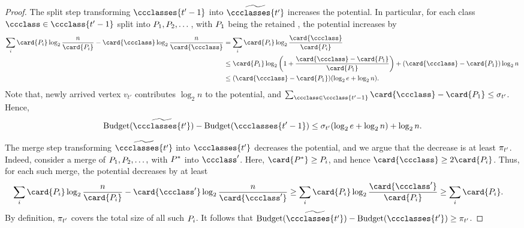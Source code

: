 \begin{proof}
    The split step transforming $ \ccclasses{t'-1} $ into $ \widetilde{\ccclasses{t'}} $ increases the potential. In particular, for each class $ \ccclass \in \ccclass{t'-1} $ split into $ P_{1}, P_{2}, \dots  $, with $ P_{1} $ being the retained \piece{}, the potential increases by
    \begin{align}
        \sum_{i} \card{\pieceToMerge_{i}}\log_{2} \frac{n}{\card{\pieceToMerge_{i}}} - \card{\ccclass}\log_{2} \frac{n}{\card{\ccclass}} &= \sum_{i}\card{\pieceToMerge_{i}} \log_{2}\dfrac{\card{\ccclass}}{\card{\pieceToMerge_{i}}} \nonumber \\
                                                                                                                                                 &\leq \card{\pieceToMerge_{1}}\log_{2}\left(1+\dfrac{\card{\ccclass}-\card{\pieceToMerge_{1}}}{\card{\pieceToMerge_{1}}}\right) + (\card{\ccclass} - \card{\pieceToMerge_{1}})\log_{2}n  \nonumber \\
                                                                                                                                                 &\leq (\card{\ccclass} - \card{\pieceToMerge_{1}})(\log_{2}e + \log_{2}n). \nonumber
    \end{align}
    Note that, newly arrived vertex $ v_{t'} $ contributes $ \log_{2}n $ to the potential, and $ \sum_{\ccclass\in \ccclass{t'-1}}\card{\ccclass} - \card{\pieceToMerge_{1}} \leq \newpiecesize{t'} $.
    Hence,
    \begin{align}
        \potential{\widetilde{\ccclasses{t'}}} - \potential{\ccclasses{t'-1}} \leq \newpiecesize{t'}(\log_{2}e + \log_{2}n) + \log_{2}n. \label{eq.split.increases.potential}
    \end{align}

    The merge step transforming $ \widetilde{\ccclasses{t'}} $ into $ \ccclasses{t'} $ decreases the potential, and we argue that the decrease is at least $ \pi_{t'} $. 
    Indeed, consider a merge of $ P_{1}, P_{2}, \dots, $ with $ P^* $ into $ \ccclass' $. Here, $ \card{\pieceToMerge^*} \geq \pieceToMerge_{i} $, and hence $ \card{\ccclass}\geq 2 \card{\pieceToMerge_{i}} $.
    Thus, for each such merge, the potential decreases by at least
    \begin{align}
        \sum_{i} \card{\pieceToMerge_{i}}\log_{2} \frac{n}{\card{\pieceToMerge_{i}}} - \card{\ccclass'}\log_{2} \frac{n}{\card{\ccclass'}} &\geq \sum_{i}\card{\pieceToMerge_{i}} \log_{2}\dfrac{\card{\ccclass'}}{\card{\pieceToMerge_{i}}} \geq \sum_{i} \card{\pieceToMerge_{i}}. \nonumber
    \end{align}
    By definition, $ \pi_{t'} $ covers the total size of all such $ P_{i} $.
    It follows that $ \potential{\widetilde{\ccclasses{t'}}} - \potential{\ccclasses{t'}} \geq \smallpiecesize{t'} $.


\end{proof}

